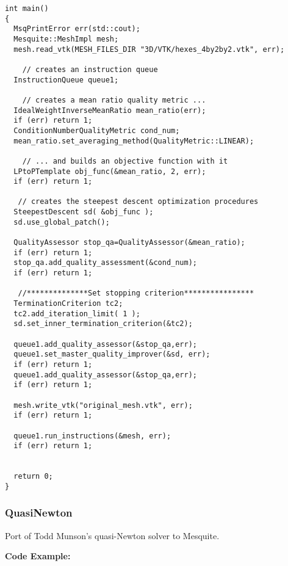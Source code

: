 \begin{lstlisting}[frame=single]
int main()
{
  MsqPrintError err(std::cout);
  Mesquite::MeshImpl mesh;
  mesh.read_vtk(MESH_FILES_DIR "3D/VTK/hexes_4by2by2.vtk", err);
  
    // creates an instruction queue
  InstructionQueue queue1;
  
    // creates a mean ratio quality metric ...
  IdealWeightInverseMeanRatio mean_ratio(err);
  if (err) return 1;
  ConditionNumberQualityMetric cond_num;
  mean_ratio.set_averaging_method(QualityMetric::LINEAR);
  
    // ... and builds an objective function with it
  LPtoPTemplate obj_func(&mean_ratio, 2, err);
  if (err) return 1;

   // creates the steepest descent optimization procedures
  SteepestDescent sd( &obj_func );
  sd.use_global_patch();
  
  QualityAssessor stop_qa=QualityAssessor(&mean_ratio);
  if (err) return 1;
  stop_qa.add_quality_assessment(&cond_num);
  if (err) return 1;
    
   //**************Set stopping criterion****************
  TerminationCriterion tc2;
  tc2.add_iteration_limit( 1 );
  sd.set_inner_termination_criterion(&tc2);

  queue1.add_quality_assessor(&stop_qa,err);
  queue1.set_master_quality_improver(&sd, err); 
  if (err) return 1;
  queue1.add_quality_assessor(&stop_qa,err);
  if (err) return 1;

  mesh.write_vtk("original_mesh.vtk", err); 
  if (err) return 1;
  
  queue1.run_instructions(&mesh, err);
  if (err) return 1;
  

  return 0;
}
\end{lstlisting}


\subsubsection{QuasiNewton}
Port of Todd Munson's quasi-Newton solver to Mesquite.

\textbf{Code Example:}

